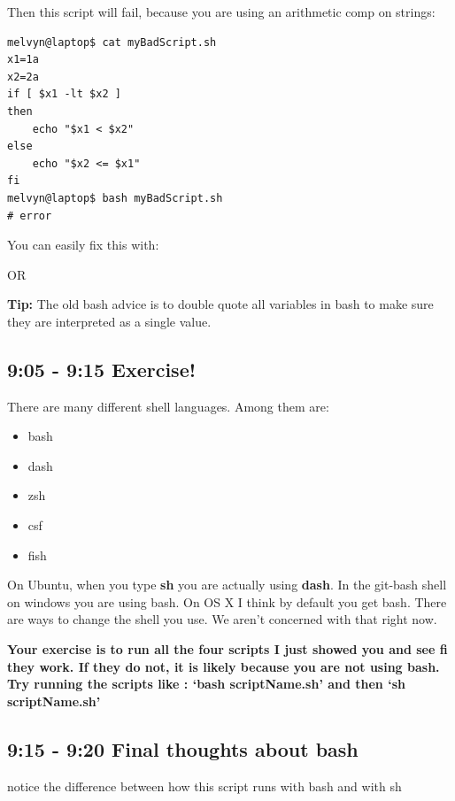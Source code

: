 \documentclass[10pt]{article}
\begin{document}
Then this script will fail, because you are using an arithmetic comp on strings:

\begin{lstlisting}[style=term]
melvyn@laptop$ cat myBadScript.sh
x1=1a
x2=2a
if [ $x1 -lt $x2 ]        
then
    echo "$x1 < $x2"
else
    echo "$x2 <= $x1"
fi
melvyn@laptop$ bash myBadScript.sh
# error
\end{lstlisting}

You can easily fix this with:



OR




\textbf{Tip:} The old bash advice is to double quote all variables in bash to make sure they are interpreted as a single value.

\subsection{9:05 - 9:15 Exercise!}

There are many different shell languages. Among them are:

\begin{itemize}
\item bash
\item dash
\item zsh
\item csf
\item fish
\end{itemize}

On Ubuntu, when you type \textbf{sh} you are actually using \textbf{dash}. In
the git-bash shell on windows you are using bash. On OS X I think by default you
get bash. There are ways to change the shell you use. We aren't concerned with
that right now.

\textbf{Your exercise is to run all the four scripts I just showed you and see
fi they work. If they do not, it is likely because you are not using bash. Try
running the scripts like  : `bash scriptName.sh' and then `sh scriptName.sh'}

\subsection{9:15 - 9:20 Final thoughts about bash}
notice the difference between how this script runs with bash and with sh
\end{document}

